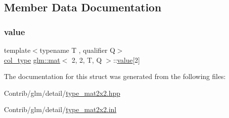 \subsection{Member Data Documentation}
\mbox{\label{structglm_1_1mat_3_012_00_012_00_01_t_00_01_q_01_4_a68d5d8eb032c2089e37ffe09c786da80}} 
\subsubsection{\texorpdfstring{value}{value}}
{\footnotesize\ttfamily template$<$typename T , qualifier Q$>$ \\
\mbox{\hyperlink{structglm_1_1mat_3_012_00_012_00_01_t_00_01_q_01_4_a2983591534ee443dd378cedcbe771749}{col\+\_\+type}} \mbox{\hyperlink{structglm_1_1mat}{glm\+::mat}}$<$ 2, 2, T, Q $>$\+::\mbox{\hyperlink{_s_d_l__opengl__glext_8h_a8ad81492d410ff2ac11f754f4042150f}{value}}\mbox{[}2\mbox{]}\hspace{0.3cm}{\ttfamily [private]}}



The documentation for this struct was generated from the following files\+:\begin{DoxyCompactItemize}
\item 
Contrib/glm/detail/\mbox{\hyperlink{type__mat2x2_8hpp}{type\+\_\+mat2x2.\+hpp}}\item 
Contrib/glm/detail/\mbox{\hyperlink{type__mat2x2_8inl}{type\+\_\+mat2x2.\+inl}}\end{DoxyCompactItemize}
